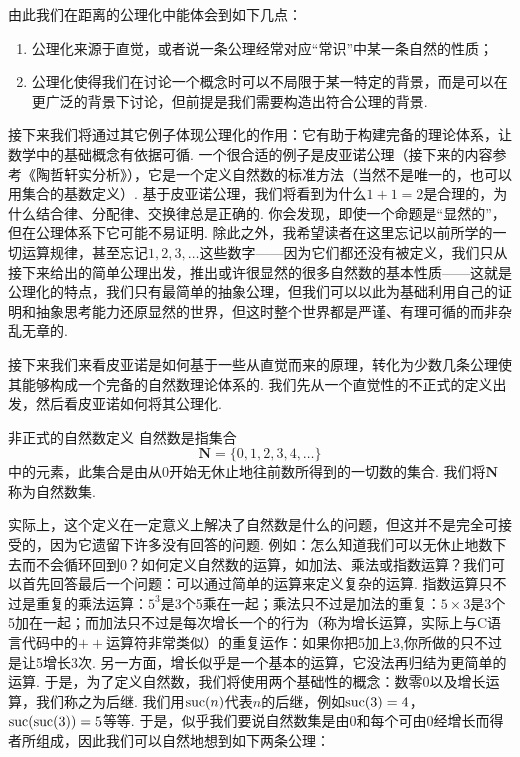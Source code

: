 由此我们在距离的公理化中能体会到如下几点：
\begin{enumerate}
    \item 公理化来源于直觉，或者说一条公理经常对应``常识''中某一条自然的性质；

    \item 公理化使得我们在讨论一个概念时可以不局限于某一特定的背景，而是可以在更广泛的背景下讨论，但前提是我们需要构造出符合公理的背景.
\end{enumerate}

接下来我们将通过其它例子体现公理化的作用：它有助于构建完备的理论体系，让数学中的基础概念有依据可循. 一个很合适的例子是皮亚诺公理（接下来的内容参考《陶哲轩实分析》），它是一个定义自然数的标准方法（当然不是唯一的，也可以用集合的基数定义）. 基于皮亚诺公理，我们将看到为什么$1+1=2$是合理的，为什么结合律、分配律、交换律总是正确的. 你会发现，即使一个命题是``显然的''，但在公理体系下它可能不易证明. 除此之外，我希望读者在这里忘记以前所学的一切运算规律，甚至忘记$1,2,3,\ldots$这些数字——因为它们都还没有被定义，我们只从接下来给出的简单公理出发，推出或许很显然的很多自然数的基本性质——这就是公理化的特点，我们只有最简单的抽象公理，但我们可以以此为基础利用自己的证明和抽象思考能力还原显然的世界，但这时整个世界都是严谨、有理可循的而非杂乱无章的.

接下来我们来看皮亚诺是如何基于一些从直觉而来的原理，转化为少数几条公理使其能够构成一个完备的自然数理论体系的. 我们先从一个直觉性的不正式的定义出发，然后看皮亚诺如何将其公理化.

\begin{definition}{非正式的自然数定义}{}
    自然数是指集合
    \[\mathbf{N}=\{0,1,2,3,4,\ldots\}\]
    中的元素，此集合是由从0开始无休止地往前数所得到的一切数的集合. 我们将$\mathbf{N}$称为自然数集.
\end{definition}

实际上，这个定义在一定意义上解决了自然数是什么的问题，但这并不是完全可接受的，因为它遗留下许多没有回答的问题. 例如：怎么知道我们可以无休止地数下去而不会循环回到0？如何定义自然数的运算，如加法、乘法或指数运算？我们可以首先回答最后一个问题：可以通过简单的运算来定义复杂的运算. 指数运算只不过是重复的乘法运算：$5^3$是3个5乘在一起；乘法只不过是加法的重复：$5\times 3$是3个5加在一起；而加法只不过是每次增长一个的行为（称为增长运算，实际上与C语言代码中的$++$运算符非常类似）的重复运作：如果你把5加上3,你所做的只不过是让5增长3次. 另一方面，增长似乎是一个基本的运算，它没法再归结为更简单的运算. 于是，为了定义自然数，我们将使用两个基础性的概念：数零0以及增长运算，我们称之为后继. 我们用$\operatorname{suc}(n)$代表$n$的后继，例如$\operatorname{suc}(3)=4$，$\operatorname{suc}(\operatorname{suc}(3))=5$等等. 于是，似乎我们要说自然数集是由0和每个可由0经增长而得者所组成，因此我们可以自然地想到如下两条公理：

